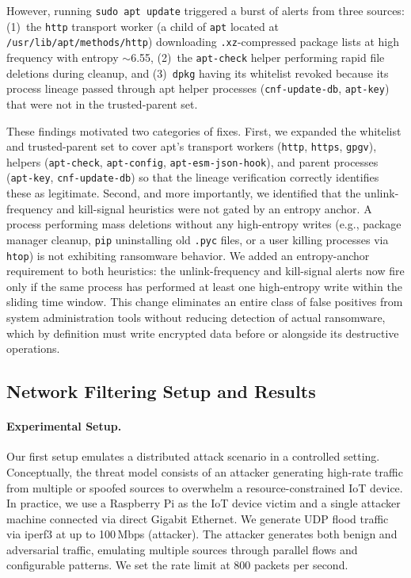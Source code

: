 \documentclass[twocolumn, 10pt]{scrartcl}
\begin{document}
However, running \texttt{sudo apt update} triggered a burst of alerts from three sources: (1)~the \texttt{http} transport worker (a child of \texttt{apt} located at \texttt{/usr/lib/apt/methods/http}) downloading \texttt{.xz}-compressed package lists at high frequency with entropy $\sim$6.55, (2)~the \texttt{apt-check} helper performing rapid file deletions during cleanup, and (3)~\texttt{dpkg} having its whitelist revoked because its process lineage passed through apt helper processes (\texttt{cnf-update-db}, \texttt{apt-key}) that were not in the trusted-parent set.

These findings motivated two categories of fixes. First, we expanded the whitelist and trusted-parent set to cover apt's transport workers (\texttt{http}, \texttt{https}, \texttt{gpgv}), helpers (\texttt{apt-check}, \texttt{apt-config}, \texttt{apt-esm-json-hook}), and parent processes (\texttt{apt-key}, \texttt{cnf-update-db}) so that the lineage verification correctly identifies these as legitimate. Second, and more importantly, we identified that the unlink-frequency and kill-signal heuristics were not gated by an entropy anchor. A process performing mass deletions without any high-entropy writes (e.g., package manager cleanup, \texttt{pip} uninstalling old \texttt{.pyc} files, or a user killing processes via \texttt{htop}) is not exhibiting ransomware behavior. We added an entropy-anchor requirement to both heuristics: the unlink-frequency and kill-signal alerts now fire only if the same process has performed at least one high-entropy write within the sliding time window. This change eliminates an entire class of false positives from system administration tools without reducing detection of actual ransomware, which by definition must write encrypted data before or alongside its destructive operations.

\subsection{Network Filtering Setup and Results}
\paragraph{Experimental Setup.}
Our first setup emulates a distributed attack scenario in a controlled setting. Conceptually, the threat model consists of an attacker generating high-rate traffic from multiple or spoofed sources to overwhelm a resource-constrained IoT device. In practice, we use a Raspberry Pi as the IoT device victim and a single attacker machine connected via direct Gigabit Ethernet. We generate UDP flood traffic via iperf3 at up to 100\,Mbps (attacker). The attacker generates both benign and adversarial traffic, emulating multiple sources through parallel flows and configurable patterns. We set the rate limit at 800 packets per second.
\end{document}
